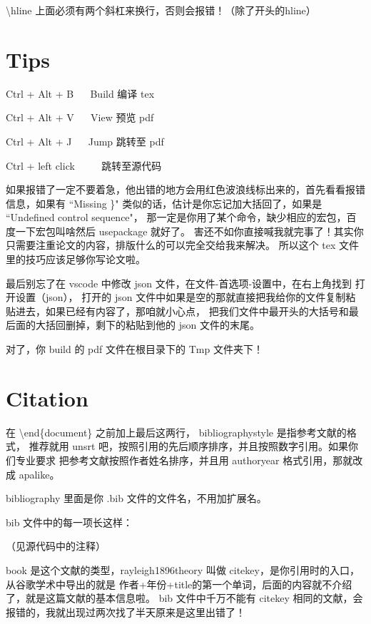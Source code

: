 \textbackslash hline 上面必须有两个斜杠来换行，否则会报错！（除了开头的hline）

\section{Tips}

Ctrl + Alt + B ~~ Build 编译 tex %

Ctrl + Alt + V ~~ View  预览 pdf

Ctrl + Alt + J ~~ Jump  跳转至 pdf

Ctrl + left click ~~~~ 跳转至源代码

如果报错了一定不要着急，他出错的地方会用红色波浪线标出来的，首先看看报错信息，如果有
``Missing \}" 类似的话，估计是你忘记加大括回了，如果是 ``Undefined control sequence"，
那一定是你用了某个命令，缺少相应的宏包，百度一下宏包叫啥然后 usepackage 就好了。
害还不如你直接喊我就完事了！其实你只需要注重论文的内容，排版什么的可以完全交给我来解决。
所以这个 tex 文件里的技巧应该足够你写论文啦。

最后别忘了在 vscode 中修改 json 文件，在文件-首选项-设置中，在右上角找到 打开设置（json），
打开的 json 文件中如果是空的那就直接把我给你的文件复制粘贴进去，如果已经有内容了，那咱就小心点，
把我们文件中最开头的大括号和最后面的大括回删掉，剩下的粘贴到他的 json 文件的末尾。

对了，你 build 的 pdf 文件在根目录下的 Tmp 文件夹下！

\section{Citation}
在 \textbackslash end\{document\} 之前加上最后这两行， bibliographystyle 是指参考文献的格式，
推荐就用 unsrt 吧，按照引用的先后顺序排序，并且按照数字引用。如果你们专业要求
把参考文献按照作者姓名排序，并且用 authoryear 格式引用，那就改成 apalike。

bibliography 里面是你 .bib 文件的文件名，不用加扩展名\cite{Garzone2002Interpretinginthe,Gentzler2017Translationandrewriting,JinYing2018JiaoTiChuan}。

bib 文件中的每一项长这样：

（见源代码中的注释）

book 是这个文献的类型，rayleigh1896theory 叫做 citekey，是你引用时的入口，从谷歌学术中导出的就是\cite[p.~14]{Officer1958Introductiontothe}\cite{Malmkjaer2017TheRoutledgeHandbook}
作者+年份+title的第一个单词，后面的内容就不介绍了，就是这篇文献的基本信息啦。
bib 文件中千万不能有 citekey 相同的文献，会报错的，我就出现过两次找了半天原来是这里出错了！\cite[pp.~12--19]{Malmkjaer2017TheRoutledgeHandbook}

